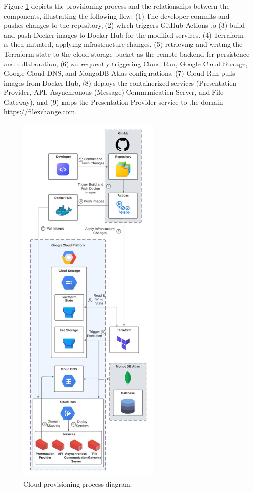 \documentclass[a4paper,fleqn]{cas-sc}
\begin{document}
Figure \ref{fig:provisioning} depicts the provisioning process and the relationships between the components, illustrating the following flow: (1) The developer commits and pushes changes to the repository, (2) which triggers GitHub Actions to (3) build and push Docker images to Docker Hub for the modified services. (4) Terraform is then initiated, applying infrastructure changes, (5) retrieving and writing the Terraform state to the cloud storage bucket as the remote backend for persistence and collaboration, (6) subsequently triggering Cloud Run, Google Cloud Storage, Google Cloud DNS, and MongoDB Atlas configurations. (7) Cloud Run pulls images from Docker Hub, (8) deploys the containerized services (Presentation Provider, API, Asynchronous (Message) Communication Server, and File Gateway), and (9) maps the Presentation Provider service to the domain \url{https://filexchange.com}.

\begin{figure}[h]
\centering
\includegraphics[width=7cm]{CloudProvisioning.jpeg}
\caption{Cloud provisioning process diagram.}
\label{fig:provisioning}
\end{figure}
\end{document}
